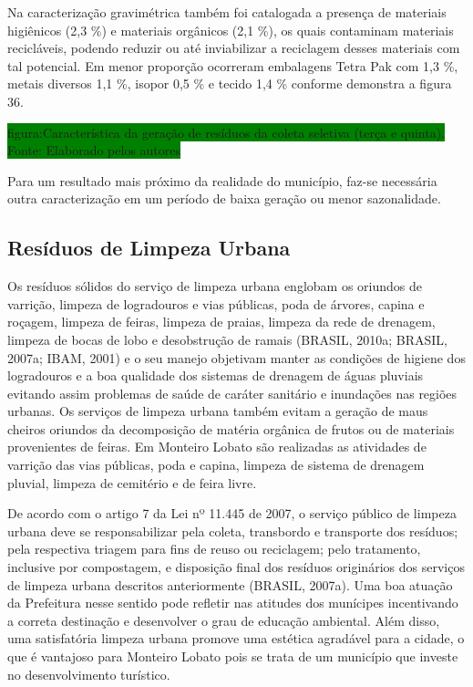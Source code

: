 	Na caracterização gravimétrica também foi catalogada a presença de materiais higiênicos (2,3 \%) e materiais orgânicos (2,1 \%), os quais contaminam materiais recicláveis, podendo reduzir ou até inviabilizar a reciclagem desses materiais com tal potencial. Em menor proporção ocorreram embalagens Tetra Pak com 1,3 \%, metais diversos 1,1 \%, isopor 0,5 \% e tecido 1,4 \% conforme demonstra a figura 36.
	
	\colorbox{green}{figura:Característica da geração de resíduos da coleta seletiva (terça e quinta). Fonte: Elaborado pelos autores}
	
	Para um resultado mais próximo da realidade do município, faz-se necessária outra caracterização em um período de baixa geração ou menor sazonalidade.
	
	\subsection{Resíduos de Limpeza Urbana}
	
	Os resíduos sólidos do serviço de limpeza urbana englobam os oriundos de varrição, limpeza de logradouros e vias públicas, poda de árvores, capina e roçagem, limpeza de feiras, limpeza de praias, limpeza da rede de drenagem, limpeza de bocas de lobo e desobstrução de ramais (BRASIL, 2010a; BRASIL, 2007a; IBAM, 2001) e o seu manejo objetivam manter as condições de higiene dos logradouros e a boa qualidade dos sistemas de drenagem de águas pluviais evitando assim problemas de saúde de caráter sanitário e inundações nas regiões urbanas. Os serviços de limpeza urbana também evitam a geração de maus cheiros oriundos da decomposição de matéria orgânica de frutos ou de materiais provenientes de feiras. Em Monteiro Lobato são realizadas as atividades de varrição das vias públicas, poda e capina, limpeza de sistema de drenagem pluvial, limpeza de cemitério e de feira livre.
	
	De acordo com o artigo 7 da Lei nº 11.445 de 2007, o serviço público de limpeza urbana deve se responsabilizar pela coleta, transbordo e transporte dos resíduos; pela respectiva triagem para fins de reuso ou reciclagem; pelo tratamento, inclusive por compostagem, e disposição final dos resíduos originários dos serviços de limpeza urbana descritos anteriormente (BRASIL, 2007a). Uma boa atuação da Prefeitura nesse sentido pode refletir nas atitudes dos munícipes incentivando a correta destinação e desenvolver o grau de educação ambiental. Além disso, uma satisfatória limpeza urbana promove uma estética agradável para a cidade, o que é vantajoso para Monteiro Lobato pois se trata de um município que investe no desenvolvimento turístico.
	 
